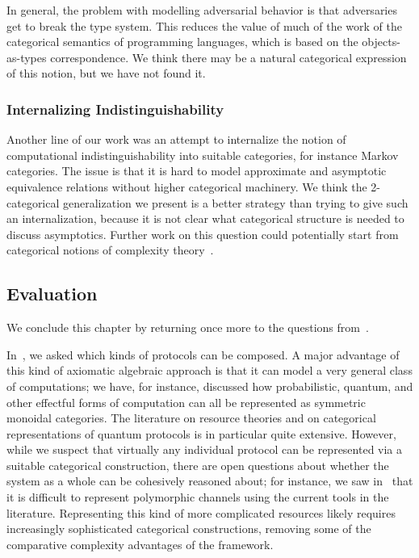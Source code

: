 In general, the problem with modelling adversarial behavior is that adversaries get to
break the type system. This reduces the value of much of the work of the categorical
semantics of programming languages, which is based on the objects-as-types
correspondence. We think there may be a natural categorical expression of this
notion, but we have not found it.

\subsubsection{Internalizing Indistinguishability}

Another line of our work was an attempt to internalize the notion of
computational indistinguishability into suitable categories, for instance Markov
categories. The issue is that it is hard to model approximate and asymptotic
equivalence relations without higher categorical machinery. We think the
2-categorical generalization we present is a better strategy than trying to give
such an internalization, because it is not clear what categorical structure is
needed to discuss asymptotics. Further work on this question could potentially
start from categorical notions of complexity theory~\cite{basu-2020}.

\subsection{Evaluation}
\label{sec:evaluation}

We conclude this chapter by returning once more to the questions
from~. 

In~, we asked which kinds of protocols can be
composed. A major advantage of this kind of axiomatic algebraic approach is
that it can model a very general class of computations; we have, for instance,
discussed how probabilistic, quantum, and other effectful forms of computation
can all be represented as symmetric monoidal categories. The literature on
resource theories and on categorical representations of quantum protocols is in
particular quite extensive. However, while we suspect that virtually any
individual protocol can be represented via a suitable categorical construction,
there are open questions about whether the system as a whole can be cohesively
reasoned about; for instance, we saw in~
that it is difficult to represent polymorphic channels using the current tools
in the literature. Representing this kind of more complicated resources likely
requires increasingly sophisticated categorical constructions, removing some of
the comparative complexity advantages of the framework.

